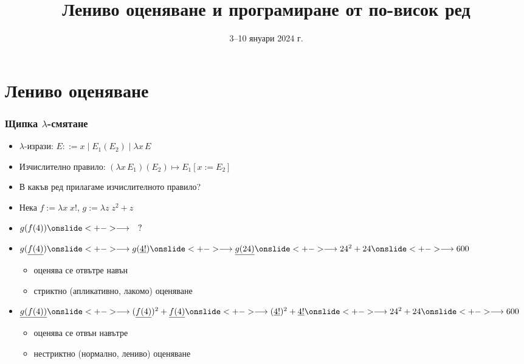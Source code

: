\documentclass[alsotrans,beameroptions={aspectratio=169}]{beamerswitch}
\title[Лениво оценяване]{Лениво оценяване и програмиране от по-висок ред}
\date{3--10 януари 2024 г.}
\newcommand{\lra}{\onslide<+->$\longrightarrow$\xspace}
\begin{document}
\begin{frame}
  \titlepage
\end{frame}

\section{Лениво оценяване}

\begin{frame}
  \frametitle{Щипка $\lambda$-смятане}

  \renewcommand{\lra}{\onslide<+->\longrightarrow\xspace}
  \begin{itemize}[<+->]
  \item $\lambda$-изрази: $E ::= x \;|\; E_1(E_2) \;|\; \lambda x\, E$
  \item Изчислително правило: $(\lambda x\,E_1)(E_2) \mapsto E_1[x := E_2]$
  \item В какъв ред прилагаме изчислителното правило?
  \item Нека $f := \lambda x\; x!$, $g := \lambda z\;z^2+z$
  \item $g(f(4)) \lra \quad ?$
  \item $g(\underline{f(4)})
    \lra g(\underline{4!})
    \lra \underline{g(24)}
    \lra 24^2 + 24
    \lra 600$
    \begin{itemize}
    \item<16-> оценява се \alert{отвътре навън}
    \item<17-> \alert{стриктно} (апликативно, лакомо) оценяване
    \end{itemize}
  \item $\underline{g(f(4))}
    \lra (\underline{f(4)})^2 + \underline{f(4)}
    \lra (\underline{4!})^2 + \underline{4!}
    \lra 24^2 + 24
    \lra 600$
    \begin{itemize}
    \item<16-> оценява се \alert{отвън навътре}
    \item<17-> \alert{нестриктно} (нормално, лениво) оценяване
    \end{itemize}
  \end{itemize}
\end{frame}
\end{document}
